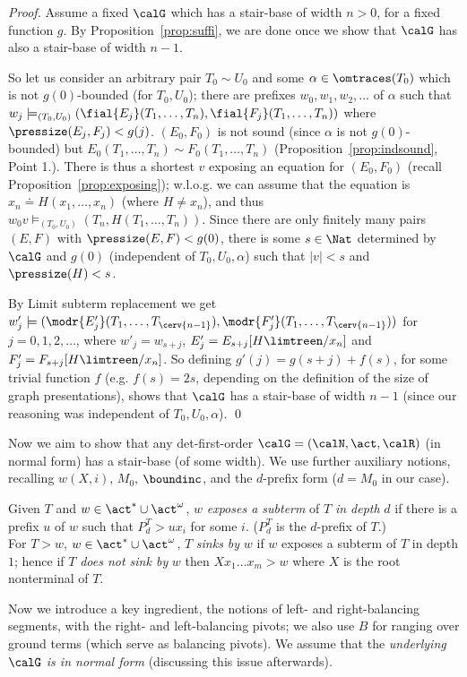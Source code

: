 \documentclass[12pt]{article}
\begin{document}
\begin{proof}
Assume a fixed $\calG$ which has a stair-base of width
$n>0$, for a fixed function $g$.
By Proposition~\ref{prop:suffi}, we are done
once we show
that $\calG$ has also  a stair-base of width $n{-}1$.

So let us consider an arbitrary pair $T_0\sim U_0$
and some $\alpha\in\omtraces(T_0)$ which is not $g(0)$-bounded (for
$T_0,U_0$);
there are prefixes $w_0, w_1, w_2,\dots $ of $\alpha$ such
that 
$w_j\models_{(T_0,U_0)} (\fial{E_j}(T_1,  \dots, T_n), \fial{F_j}(T_1,  \dots, T_n))$
where $\pressize(E_j,F_j)<g(j)$. 
$(E_0,F_0)$ is not sound (since $\alpha$ is not $g(0)$-bounded)
but  $E_0(T_1,  \dots, T_n)\sim F_0(T_1,  \dots, T_n)$
(Proposition~\ref{prop:indsound}, Point 1.).
There is thus a
shortest $v$ exposing an equation for $(E_0,F_0)$ 
(recall Proposition~\ref{prop:exposing}); w.l.o.g. we can assume that
the equation is $x_n\doteq H(x_1,\dots,x_n)$ (where $H\neq x_n$), and thus
$w_0v\models_{(T_0,U_0)} (T_n, H(T_1,  \dots, T_n))$.
Since there are only finitely many pairs $(E,F)$ with
$\pressize(E,F)<g(0)$, there is some $s\in\Nat$ determined by 
$\calG$ and $g(0)$ (independent of $T_0,U_0,\alpha$) 
such that $|v|<s$ and $\pressize(H)<s$.

By Limit subterm replacement we get
$w'_j\models (\modr{E'_j}(T_1,  \dots, T_{\cerv{n-1}}), 
\modr{F'_j}(T_1,  \dots, T_{\cerv{n-1}}))$
for $j=0,1,2,\dots$, where
$w'_j=w_{s+j}$, 
$E'_{j}=E_{s+j}[H\limtreen/x_n]$
and
$F'_{j}=F_{s+j}[H\limtreen/x_n]$.
So defining $g'(j)=g(s+j)+f(s)$, for some trivial function $f$
(e.g. $f(s)=2s$, depending on the definition of the size of graph presentations), 
shows that  $\calG$ has a stair-base of width $n{-}1$
(since our reasoning was independent of $T_0,U_0,\alpha$).
\qed
\end{proof}



\noindent
Now we aim to show that any det-first-order
$\calG=(\calN,\act,\calR)$ (in normal form)
has a stair-base (of some width).
We use further auxiliary notions,
recalling 
$w(X,i)$,
$M_0$, $\boundinc$, and the $d$-prefix form ($d=M_0$ in our case).
 
 \begin{defn}\label{def:exposing}
Given $T$ and $w\in\act^*\cup\act^{\omega}$, $w$ \emph{exposes a
subterm} of $T$ \emph{in depth} $d$ if there is a prefix $u$ of $w$ such that 
$P_d^T\gt{u}x_i$ for some $i$. ($P^T_d$ is the $d$-prefix of $T$.)
\\
For  $T\gt{w}$, $w\in\act^*\cup\act^{\omega}$, 
$T$ \emph{sinks by} $w$ if 
$w$ exposes a subterm of $T$ in depth $1$; hence if  
$T$ \emph{does not sink by} 
$w$ then
$Xx_1\dots x_m\gt{w}$ where
$X$ is the root nonterminal of $T$.
\end{defn}
Now we introduce a key ingredient,
the notions of left- and right-balancing segments, with the right- and
left-balancing pivots; we also use $B$ for ranging over ground terms
(which serve as balancing pivots). We assume that
the \emph{underlying}
$\calG$ \emph{is in normal form} (discussing this issue afterwards).
\end{document}
